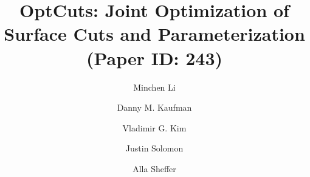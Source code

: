 \documentclass[acmtog, review, anonymous]{acmart}
\begin{document}
\title{OptCuts: Joint Optimization of Surface Cuts and Parameterization
\\ {\small (Paper ID: 243)}
} 

\author{Minchen Li}

\author{Danny M. Kaufman}

\author{Vladimir G. Kim} 

\author{Justin Solomon}

\author{Alla Sheffer}

\renewcommand\shortauthors{Li, M. et al}

\newcommand{\minchen}[1]{\textcolor{blue}{\textbf{Minchen: #1}}}
\newcommand{\justin}[1]{\textcolor{red}{\textbf{Justin: #1}}}
\newcommand{\alla}[1]{\textcolor{orange}{\textbf{Alla: #1}}}
\newcommand{\danny}[1]{\textcolor{purple}{\textbf{Danny: #1}}}
\newcommand{\vova}[1]{\textcolor{green}{\textbf{Vova: #1}}}
\newcommand{\revised}[1]{\textcolor{red}{\textbf{#1}}}
\newcommand{\old}[1]{\textcolor{green}{\sout{#1}}}
\end{document}
